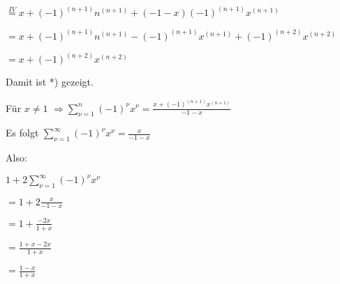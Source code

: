 $ \overset{IV}{=} x + (-1)^{(n+1)} n^{(n+1)} + (-1-x) (-1)^{(n+1)} x^{(n+1)}$

$ =  x + (-1)^{(n+1)} n^{(n+1)} - (-1)^{(n+1)} x^{(n+1)} + (-1)^{(n+2)} x^{(n+2)}$

$ = x + (-1)^{(n+2)}x^{(n+2)}$

Damit ist *) gezeigt.

Für $x \neq 1 $
$\Rightarrow \sum\limits^{n}_{\nu=1}(-1)^{\nu}x^{\nu} = \frac{x+(-1)^{(n+1)}x^{(n+1)}}{-1-x}$ 

Es folgt $\sum\limits^{\infty}_{\nu=1}(-1)^{\nu}x^{\nu} = \frac{x}{-1-x}$

Also:

$1+2\sum\limits^{\infty}_{\nu=1}(-1)^{\nu}x^{\nu} $

$ = 1+2\frac{x}{-1-x}$

$ = 1 + \frac{-2x}{1+x}$

$ = \frac{1+x-2x}{1+x}$

$ = \frac{1-x}{1+x}$


